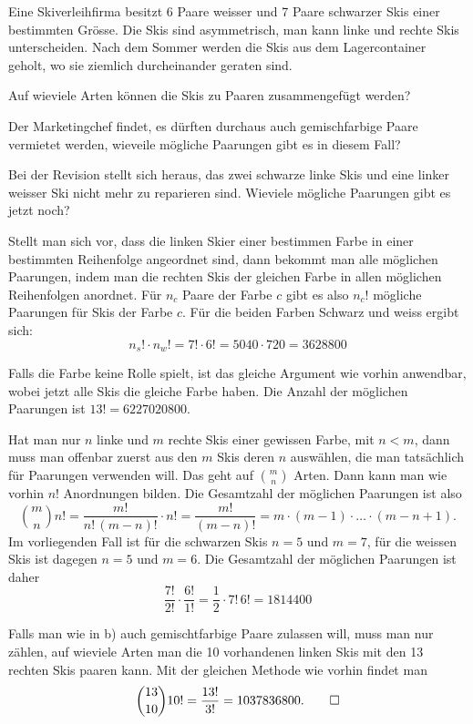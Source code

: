 Eine Skiverleihfirma besitzt 6 Paare weisser und 7 Paare schwarzer Skis
einer bestimmten Grösse. Die Skis sind asymmetrisch, man kann linke
und rechte Skis unterscheiden.
Nach dem Sommer werden die Skis aus dem Lagercontainer geholt, 
wo sie ziemlich durcheinander geraten sind.
\begin{teilaufgaben}
\item Auf wieviele Arten können die Skis zu Paaren zusammengefügt werden?
\item Der Marketingchef findet, es dürften durchaus auch gemischfarbige Paare
vermietet werden, wieveile mögliche Paarungen gibt es in diesem
Fall?
\item Bei der Revision stellt sich heraus, das zwei schwarze linke Skis
und eine linker weisser Ski nicht mehr zu reparieren sind. Wieviele
mögliche Paarungen gibt es jetzt noch?
\end{teilaufgaben}


\begin{loesung}
\begin{teilaufgaben}
\item Stellt man sich vor, dass die linken Skier einer bestimmen
Farbe in einer bestimmten
Reihenfolge angeordnet sind, dann bekommt man alle möglichen Paarungen,
indem man die rechten Skis der gleichen Farbe in allen möglichen
Reihenfolgen anordnet.
Für $n_c$ Paare der Farbe $c$ gibt es also $n_c!$ mögliche
Paarungen für Skis der Farbe $c$. Für die beiden Farben Schwarz
und weiss ergibt sich:
\[
n_s!\cdot n_w!=7!\cdot 6!=5040\cdot 720=3628800
\]
\item
Falls die Farbe keine Rolle spielt, ist das gleiche Argument wie vorhin
anwendbar, wobei jetzt alle Skis die gleiche Farbe haben. Die Anzahl
der möglichen Paarungen ist $13!=6227020800$.
\item
Hat man nur $n$ linke und $m$ rechte Skis einer gewissen Farbe, mit $n<m$,
dann muss man offenbar zuerst aus den $m$ Skis deren $n$ auswählen,
die man tatsächlich für Paarungen verwenden will. Das geht auf $\binom{m}{n}$
Arten. Dann kann man wie vorhin $n!$ Anordnungen bilden. Die Gesamtzahl
der möglichen Paarungen ist also 
\[
\binom{m}{n}n!=\frac{m!}{n!\,(m-n)!}\cdot n!=\frac{m!}{(m-n)!}
=
m\cdot(m-1)\cdot\dots\cdot(m-n+1).
\]
Im vorliegenden Fall ist für die schwarzen Skis $n=5$ und $m=7$,
für die weissen Skis ist dagegen $n=5$ und $m=6$.
Die Gesamtzahl der möglichen Paarungen ist daher
\[
\frac{7!}{2!}\cdot \frac{6!}{1!}
=\frac12\cdot 7!\,6!=1814400
\]
\end{teilaufgaben}
Falls man wie in b) auch gemischtfarbige Paare zulassen will, muss
man nur zählen, auf wieviele Arten man die 10 vorhandenen
linken Skis mit den 13 rechten Skis paaren kann. Mit der gleichen
Methode wie vorhin findet man
\[
\binom{13}{10}10!=\frac{13!}{3!}=1037836800.
\qedhere
\]
\end{loesung}

